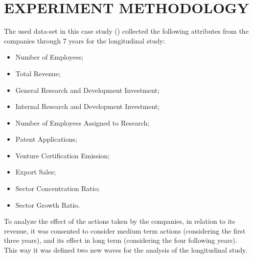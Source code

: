 \documentclass[a4paper,twoside]{article}
\begin{document}
\section{\uppercase{Experiment Methodology}}

The used data-set in this case study (\cite{KIM2019103967}) collected the following attributes from the companies through 7 years for the longitudinal study:

\begin{itemize}
    \item Number of Employees;
    \item Total Revenue;
    \item General Research and Development Investment;
    \item Internal Research and Development Investment;
    \item Number of Employees Assigned to Research;
    \item Patent Applications;
    \item Venture Certification Emission;
    \item Export Sales;
    \item Sector Concentration Ratio;
    \item Sector Growth Ratio.
\end{itemize}

To analyze the effect of the actions taken by the companies, in relation to its revenue, it was consented to consider medium term actions (considering the first three years), and its effect in long term (considering the four following years). This way it was defined two new waves for the analysis of the longitudinal study.
\end{document}

